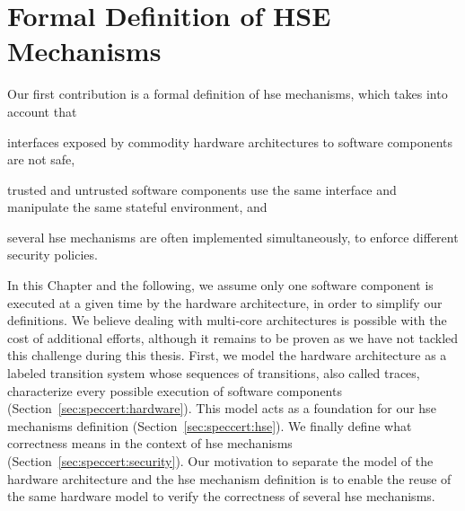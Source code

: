\chapter{Formal Definition of HSE Mechanisms}
\label{chapter:speccert}


\vspace{1cm}%
\noindent
%
Our first contribution is a formal definition of \ac{hse} mechanisms, which
takes into account that
%
%
\begin{inparaenum}[(1)]
\item interfaces exposed by commodity hardware architectures to software
  components are not safe,
\item trusted and untrusted software components use the same interface and
  manipulate the same stateful environment, and
\item several \ac{hse} mechanisms are often implemented simultaneously, to
  enforce different security policies.
\end{inparaenum}

%
In this Chapter and the following, we assume only one software component is
executed at a given time by the hardware architecture, in order to simplify our
definitions.
%
We believe dealing with multi-core architectures is possible with the cost of
additional efforts, although it remains to be proven as we have not tackled this
challenge during this thesis.
%
%
First, we model the hardware architecture as a labeled transition system whose
sequences of transitions, also called traces, characterize every possible
execution of software components (Section~\ref{sec:speccert:hardware}).
%
This model acts as a foundation for our \ac{hse} mechanisms definition
(Section~\ref{sec:speccert:hse}).
%
We finally define what correctness means in the context of \ac{hse} mechanisms
(Section~\ref{sec:speccert:security}).
%
Our motivation to separate the model of the hardware architecture and the
\ac{hse} mechanism definition is to enable the reuse of the same hardware model
to verify the correctness of several \ac{hse} mechanisms.

